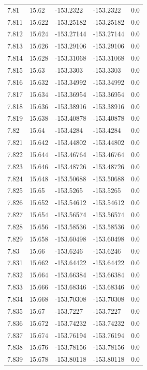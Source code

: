 \begin{tabular}{lllll}
7.81 & 15.62 & -153.2322 & -153.2322 & 0.0 \\
7.811 & 15.622 & -153.25182 & -153.25182 & 0.0 \\
7.812 & 15.624 & -153.27144 & -153.27144 & 0.0 \\
7.813 & 15.626 & -153.29106 & -153.29106 & 0.0 \\
7.814 & 15.628 & -153.31068 & -153.31068 & 0.0 \\
7.815 & 15.63 & -153.3303 & -153.3303 & 0.0 \\
7.816 & 15.632 & -153.34992 & -153.34992 & 0.0 \\
7.817 & 15.634 & -153.36954 & -153.36954 & 0.0 \\
7.818 & 15.636 & -153.38916 & -153.38916 & 0.0 \\
7.819 & 15.638 & -153.40878 & -153.40878 & 0.0 \\
7.82 & 15.64 & -153.4284 & -153.4284 & 0.0 \\
7.821 & 15.642 & -153.44802 & -153.44802 & 0.0 \\
7.822 & 15.644 & -153.46764 & -153.46764 & 0.0 \\
7.823 & 15.646 & -153.48726 & -153.48726 & 0.0 \\
7.824 & 15.648 & -153.50688 & -153.50688 & 0.0 \\
7.825 & 15.65 & -153.5265 & -153.5265 & 0.0 \\
7.826 & 15.652 & -153.54612 & -153.54612 & 0.0 \\
7.827 & 15.654 & -153.56574 & -153.56574 & 0.0 \\
7.828 & 15.656 & -153.58536 & -153.58536 & 0.0 \\
7.829 & 15.658 & -153.60498 & -153.60498 & 0.0 \\
7.83 & 15.66 & -153.6246 & -153.6246 & 0.0 \\
7.831 & 15.662 & -153.64422 & -153.64422 & 0.0 \\
7.832 & 15.664 & -153.66384 & -153.66384 & 0.0 \\
7.833 & 15.666 & -153.68346 & -153.68346 & 0.0 \\
7.834 & 15.668 & -153.70308 & -153.70308 & 0.0 \\
7.835 & 15.67 & -153.7227 & -153.7227 & 0.0 \\
7.836 & 15.672 & -153.74232 & -153.74232 & 0.0 \\
7.837 & 15.674 & -153.76194 & -153.76194 & 0.0 \\
7.838 & 15.676 & -153.78156 & -153.78156 & 0.0 \\
7.839 & 15.678 & -153.80118 & -153.80118 & 0.0 \\

\end{tabular}
